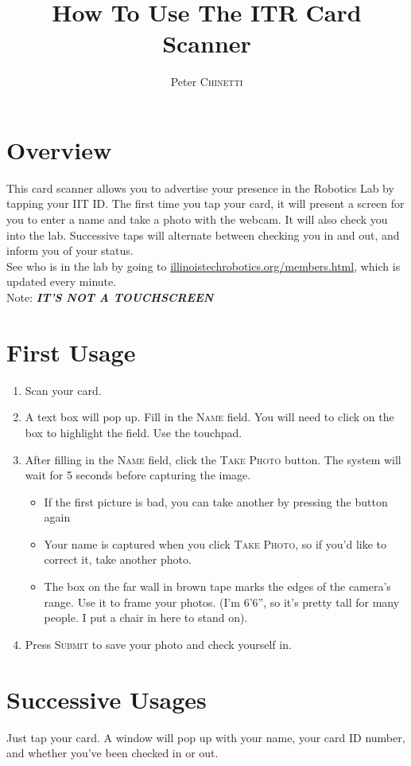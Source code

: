 \documentclass{article}
\title{How To Use The ITR Card Scanner}
\author{Peter \textsc{Chinetti}} %
\begin{document}
\maketitle %

\section{Overview}
This card scanner allows you to advertise your presence in the Robotics Lab by tapping your IIT ID. The first time you tap your card, it will present a screen for you to enter a name and take a photo with the webcam. It will also check you into the lab. Successive taps will alternate between checking you in and out, and inform you of your status.\\
See who is in the lab by going to \url{illinoistechrobotics.org/members.html}, which is updated every minute.\\
Note: {\bf \emph{IT'S NOT A TOUCHSCREEN}}


\section{First Usage}
\begin{enumerate}
\item Scan your card.
\item A text box will pop up. Fill in the \textsc{Name} field. You will need to click on the box to highlight the field. Use the touchpad.
\item After filling in the \textsc{Name} field, click the \textsc{Take Photo} button. The system will wait for 5 seconds before capturing the image. 
  \begin{itemize}
  \item If the first picture is bad, you can take another by pressing the button again
  \item Your name is captured when you click \textsc{Take Photo}, so if you'd like to correct it, take another photo.
    \item The box on the far wall in brown tape marks the edges of the camera's range. Use it to frame your photos. (I'm 6'6'', so it's pretty tall for many people. I put a chair in here to stand on).
  \end{itemize}
  \item Press \textsc{Submit} to save your photo and check yourself in.
\end{enumerate}
\section{Successive Usages}
Just tap your card. A window will pop up with your name, your card ID number, and whether you've been checked in or out.
\end{document}
